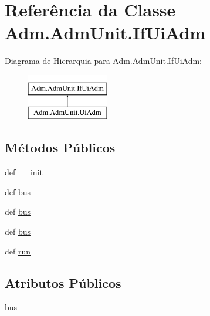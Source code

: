 \hypertarget{classAdm_1_1AdmUnit_1_1IfUiAdm}{\section{Referência da Classe Adm.\-Adm\-Unit.\-If\-Ui\-Adm}
\label{d7/d07/classAdm_1_1AdmUnit_1_1IfUiAdm}
}
Diagrama de Hierarquia para Adm.\-Adm\-Unit.\-If\-Ui\-Adm\-:\begin{figure}[H]
\begin{center}
\leavevmode
\includegraphics[height=2.000000cm]{d7/d07/classAdm_1_1AdmUnit_1_1IfUiAdm}
\end{center}
\end{figure}
\subsection*{Métodos Públicos}
\begin{DoxyCompactItemize}
\item 
def \hyperlink{classAdm_1_1AdmUnit_1_1IfUiAdm_ab37924016cd115531c85439dc82f5ea3}{\-\_\-\-\_\-init\-\_\-\-\_\-}
\item 
def \hyperlink{classAdm_1_1AdmUnit_1_1IfUiAdm_a4863c3ebab6e5fac647ab32415153470}{bus}
\item 
def \hyperlink{classAdm_1_1AdmUnit_1_1IfUiAdm_a4863c3ebab6e5fac647ab32415153470}{bus}
\item 
def \hyperlink{classAdm_1_1AdmUnit_1_1IfUiAdm_a4863c3ebab6e5fac647ab32415153470}{bus}
\item 
def \hyperlink{classAdm_1_1AdmUnit_1_1IfUiAdm_ad2879ed80544aa2a153c7eeed3a09a52}{run}
\end{DoxyCompactItemize}
\subsection*{Atributos Públicos}
\begin{DoxyCompactItemize}
\item 
\hyperlink{classAdm_1_1AdmUnit_1_1IfUiAdm_a604bb1c41014e85eee44db64a79a7fcc}{bus}
\end{DoxyCompactItemize}


